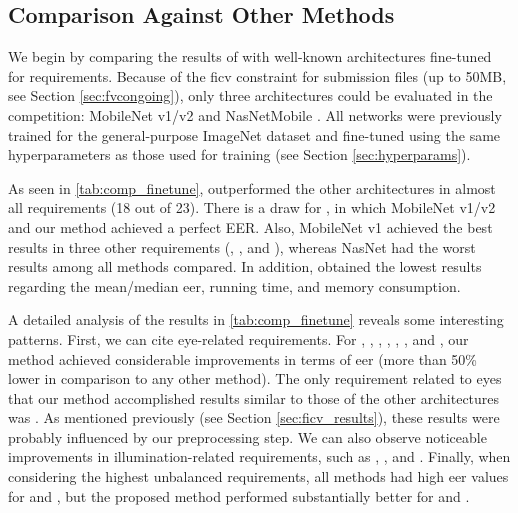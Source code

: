 \subsection{Comparison Against Other Methods}
 
We begin by comparing the results of \methodname with well-known architectures fine-tuned for \icao requirements. Because of the \acs{ficv} constraint for submission files (up to 50MB, see Section \ref{sec:fvcongoing}), only three architectures could be evaluated in the competition: MobileNet v1/v2 \citep{howard2017mobilenets, sandler2018mobilenetv2} and NasNetMobile \citep{zoph2018learning}. All networks were previously trained for the general-purpose ImageNet dataset \citep{imagenetdataset} and fine-tuned using the same hyperparameters as those used for \methodname training (see Section \ref{sec:hyperparams}).
 
As seen in \autoref{tab:comp_finetune}, \methodname outperformed the other architectures in almost all requirements (18 out of 23). There is a draw for \veiloverface, in which MobileNet v1/v2 and our method achieved a perfect EER. Also, MobileNet v1 achieved the best results in three other requirements (\pixelation, \hatcap, and \otherfacesortoys), whereas NasNet had the worst results among all methods compared. In addition, \methodname obtained the lowest results regarding the mean/median \acs{eer}, running time, and memory consumption.
 
A detailed analysis of the results in \autoref{tab:comp_finetune} reveals some interesting patterns. First, we can cite eye-related requirements. For \lookingaway, \eyesclosed, \redeyes, \darktintedlenses, \flashlenses, \framestooheavy, and \framecoveringeyes, our method achieved considerable improvements in terms of \acs{eer} (more than 50\% lower
in comparison to any other method). The only requirement related to eyes that our method accomplished results similar to those of the other architectures was \hairacrosseyes. As mentioned previously (see Section \ref{sec:ficv_results}), these results were probably influenced by our preprocessing step. We can also observe noticeable improvements in illumination-related requirements, such as \toodarklight, \shadowsbehindhead, and \shadowsacrossface. Finally, when considering the highest unbalanced requirements, all methods had high \acs{eer} values for \inkmarked and \otherfacesortoys, but the proposed method performed substantially better for \washedout and \framestooheavy.
 

 
